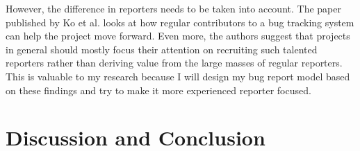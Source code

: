 \documentclass[11pt,english,twocolumn]{article}
\begin{document}
However, the difference in reporters needs to be taken into account. The 
paper published by Ko et al. \cite{ko2010power} looks at how regular 
contributors to a bug tracking system can help the project move forward. 
Even more, the authors suggest that projects in general should mostly 
focus their attention on recruiting such talented reporters rather than
deriving value from the large masses of regular reporters. This is valuable
to my research because I will design my bug report model based on 
these findings and try to make it more experienced reporter focused.

\section{Discussion and Conclusion}
\label{sec:conclusion}




\let\oldbibliography\thebibliography
\renewcommand{\thebibliography}[1]{\oldbibliography{#1}
\setlength{\itemsep}{-3pt}}


{
\scriptsize

}
\end{document}
